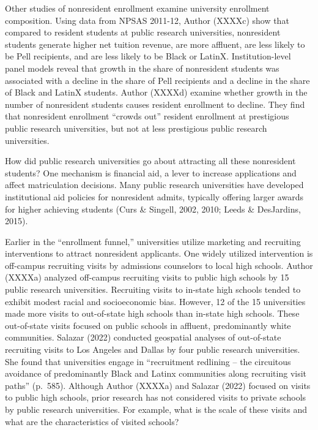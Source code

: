 \documentclass[
  12pt,
]{article}
\begin{document}
Other studies of nonresident enrollment examine university enrollment composition. Using data from NPSAS 2011-12, Author (XXXXc) show that compared to resident students at public research universities, nonresident students generate higher net tuition revenue, are more affluent, are less likely to be Pell recipients, and are less likely to be Black or LatinX. Institution-level panel models reveal that growth in the share of nonresident students was associated with a decline in the share of Pell recipients and a decline in the share of Black and LatinX students. Author (XXXXd) examine whether growth in the number of nonresident students causes resident enrollment to decline. They find that nonresident enrollment ``crowds out'' resident enrollment at prestigious public research universities, but not at less prestigious public research universities.

How did public research universities go about attracting all these nonresident students? One mechanism is financial aid, a lever to increase applications and affect matriculation decisions. Many public research universities have developed institutional aid policies for nonresident admits, typically offering larger awards for higher achieving students (Curs \& Singell, 2002, 2010; Leeds \& DesJardins, 2015).

Earlier in the ``enrollment funnel,'' universities utilize marketing and recruiting interventions to attract nonresident applicants. One widely utilized intervention is off-campus recruiting visits by admissions counselors to local high schools. Author (XXXXa) analyzed off-campus recruiting visits to public high schools by 15 public research universities. Recruiting visits to in-state high schools tended to exhibit modest racial and socioeconomic bias. However, 12 of the 15 universities made more visits to out-of-state high schools than in-state high schools. These out-of-state visits focused on public schools in affluent, predominantly white communities. Salazar (2022) conducted geospatial analyses of out-of-state recruiting visits to Los Angeles and Dallas by four public research universities. She found that universities engage in ``recruitment redlining -- the circuitous avoidance of predominantly Black and Latinx communities along recruiting visit paths'' (p.~585). Although Author (XXXXa) and Salazar (2022) focused on visits to public high schools, prior research has not considered visits to private schools by public research universities. For example, what is the scale of these visits and what are the characteristics of visited schools?
\end{document}
